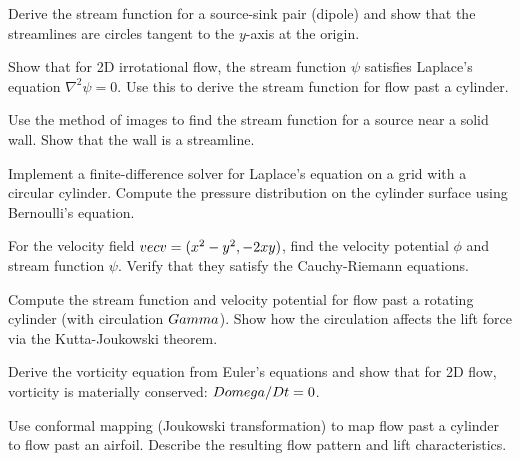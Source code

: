 \begin{exercise}
Derive the stream function for a source-sink pair (dipole) and show that the streamlines are circles tangent to the $y$-axis at the origin.
\end{exercise}

\begin{exercise}
Show that for 2D irrotational flow, the stream function $\psi$ satisfies Laplace's equation $\nabla^2 \psi = 0$. Use this to derive the stream function for flow past a cylinder.
\end{exercise}

\begin{exercise}
Use the method of images to find the stream function for a source near a solid wall. Show that the wall is a streamline.
\end{exercise}

\begin{exercise}[Computational]
Implement a finite-difference solver for Laplace's equation on a grid with a circular cylinder. Compute the pressure distribution on the cylinder surface using Bernoulli's equation.
\end{exercise}

\begin{exercise}
For the velocity field $\\vec{v} = (x^2 - y^2, -2xy)$, find the velocity potential $\phi$ and stream function $\psi$. Verify that they satisfy the Cauchy-Riemann equations.
\end{exercise}

\begin{exercise}
Compute the stream function and velocity potential for flow past a rotating cylinder (with circulation $\\Gamma$). Show how the circulation affects the lift force via the Kutta-Joukowski theorem.
\end{exercise}

\begin{exercise}
Derive the vorticity equation from Euler's equations and show that for 2D flow, vorticity is materially conserved: $D\\omega/Dt = 0$.
\end{exercise}

\begin{exercise}
Use conformal mapping (Joukowski transformation) to map flow past a cylinder to flow past an airfoil. Describe the resulting flow pattern and lift characteristics.
\end{exercise}
